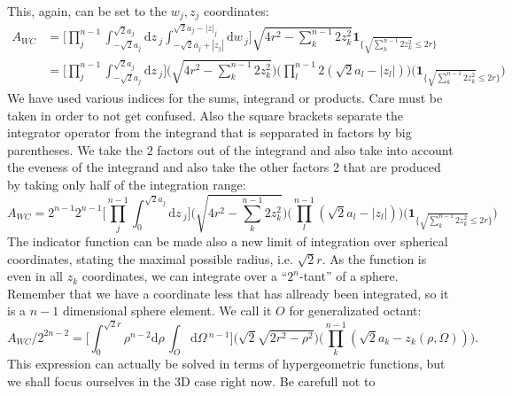 \documentclass[superscriptaddress,pre,reprint,showpacs,onecolumn]{revtex4-1}
\newcommand{\rd}[1]{\mathrm{d}{#1} \,}
\newcommand{\indicatorsymbol}{\mathbf{1}}
\newcommand{\indicator}[1]{\indicatorsymbol_{ \{   #1 \} } }
\begin{document}
  This, again, can be set to the $w_j, z_j$ coordinates:
  \begin{equation}
    \begin{split}
      A_{WC}& =  \Bigg[ \prod_j^{n-1}
        \int_{-\sqrt{2}a_j}^{\sqrt{2}a_j} \rd z_j
        \int_{-\sqrt{2}a_j+|z_j|}^{\sqrt{2}a_j-|z|_j} \rd w_j \Bigg]
      \sqrt{4 r^2 - \sum_k^{n-1} 2 z_k^2}  
        \indicator{\sqrt{\sum_k^{n-1} 2 z_k^2} \leq 2 r}\\ 
        & =  \Bigg[\prod_j^{n-1} \int_{-\sqrt{2}a_j}^{\sqrt{2}a_j}  \rd z_j \Bigg]
         \Bigg( \sqrt{4 r^2 - \sum_k^{n-1} 2 z_k^2} \Bigg)
        \Bigg(\prod_l^{n-1} 2 ( \sqrt{2}a_l - |z_l| )  \Bigg)
        \Bigg( \indicator{\sqrt{\sum_k^{n-1} 2 z_k^2} \leq 2 r} \Bigg)
    \end{split}
  \end{equation}
  We have used various indices for the sums, integrand or products.
  Care must be taken in order to not get confused. Also the square
  brackets separate the integrator operator from the integrand
  that is sepparated in factors by big parentheses.
  We take the $2$ factors out of the integrand
  and also take into account the eveness of the integrand and also
  take the other factors 2 that are produced by taking only
  half of the integration range:
  \begin{equation}
    A_{WC} = 2^{n-1} 2^{n-1}  \Bigg[ \prod_j^{n-1}
      \int_{0}^{\sqrt{2}a_j} \rd z_j
      \Bigg]
         \Bigg( \sqrt{4 r^2 - \sum_k^{n-1} 2 z_k^2} \Bigg)
        \Bigg(\prod_l^{n-1}  ( \sqrt{2}a_l - |z_l| )  \Bigg)
        \Bigg( \indicator{\sqrt{\sum_k^{n-1} 2 z_k^2} \leq 2 r} \Bigg)
  \end{equation}
  The indicator function can be made also a new limit of integration over
  spherical coordinates, stating the maximal possible radius, i.e.
  $\sqrt{2} r$. As the function
  is even in all $z_k$ coordinates, we can integrate over a ``$2^n$-tant'' of a sphere.
  Remember that we have a coordinate less that has allready been integrated, so
  it is a $n-1$ dimensional sphere element. We call it $O$ for generalizated octant:
  \begin{equation}
    A_{WC}/2^{2n-2}=
    \Bigg[\int_0^{\sqrt{2}r} \rho^{n-2} \rd \rho \int_O \rd \Omega^{n-1}\Bigg]
    \Bigg( \sqrt{2}\sqrt{2 r^2 - \rho^2} \Bigg)
    \Bigg( \prod_k^{n-1} (\sqrt{2}a_k - z_k(\rho, \Omega)) \Bigg).
  \end{equation}
  This expression can actually be solved in terms of hypergeometric functions,
  but we shall focus ourselves in the 3D case right now. Be carefull not to
\end{document}
